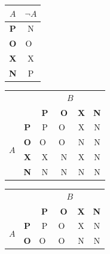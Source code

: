 \documentclass[11pt, a4paper]{article}
\begin{document}
\begin{table}[ht]
    \centering
    \shorthandoff{-}
    \begin{tabular}{| c | c |} \hline
        ${A}$      & ${\neg A}$ \\ \hline
        \textbf{P} & N          \\ \hline
        \textbf{O} & O~\\ \hline
        \textbf{X} & X          \\ \hline
        \textbf{N} & P          \\ \hline
    \end{tabular}
    \begin{tabular}{| c | c | c | c | c | c |} \hline
        \multicolumn{2}{|c|}{ \multirow{2}{*}{${A \land B}$} } & \multicolumn{4}{|c|}{$B$}                                            \\ \cline{3-6}
        \multicolumn{2}{|c|}{}                                 & \textbf{P}                & \textbf{O} & \textbf{X} & \textbf{N}     \\ \hline
        \multirow{4}{*}[0pt]{$A$}                              & \textbf{P}                & P          & O~& X          & N \\ \cline{2-6}
                                                               & \textbf{O}                & O~& O~& N          & N \\ \cline{2-6}
                                                               & \textbf{X}                & X          & N          & X          & N \\ \cline{2-6}
                                                               & \textbf{N}                & N          & N          & N          & N \\ \hline
    \end{tabular}
    \begin{tabular}{| c | c | c | c | c | c |} \hline
        \multicolumn{2}{|c|}{ \multirow{2}{*}{${A \lor B}$} } & \multicolumn{4}{|c|}{$B$}                                            \\ \cline{3-6}
        \multicolumn{2}{|c|}{}                                & \textbf{P}                & \textbf{O} & \textbf{X} & \textbf{N}     \\ \hline
        \multirow{4}{*}[0pt]{$A$}                             & \textbf{P}                & P          & O~& X          & N \\ \cline{2-6}
                                                              & \textbf{O}                & O~& O~& N          & N \\ \cline{2-6}

\end{tabular}
\end{table}
\end{document}
